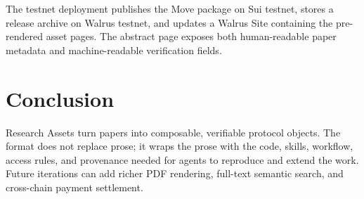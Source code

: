 \documentclass{article}
\begin{document}
The testnet deployment publishes the Move package on Sui testnet, stores a
release archive on Walrus testnet, and updates a Walrus Site containing the
pre-rendered asset pages. The abstract page exposes both human-readable paper
metadata and machine-readable verification fields.

\section{Conclusion}
Research Assets turn papers into composable, verifiable protocol objects. The
format does not replace prose; it wraps the prose with the code, skills,
workflow, access rules, and provenance needed for agents to reproduce and extend the
work. Future iterations can add richer PDF rendering, full-text semantic search,
and cross-chain payment settlement.



\end{document}
